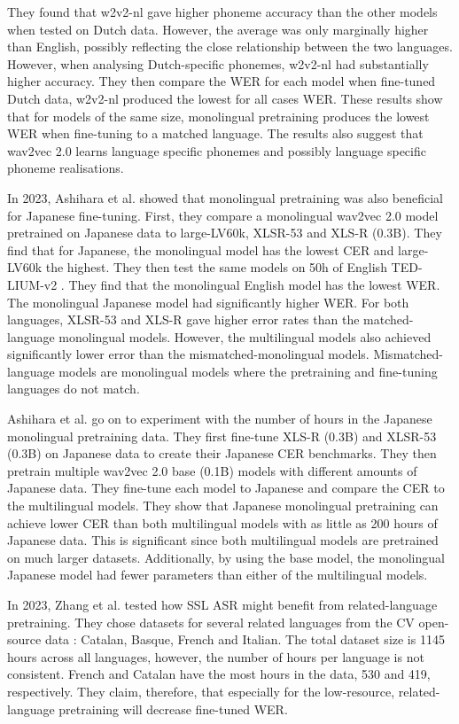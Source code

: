 They found that w2v2-nl gave higher phoneme accuracy than the other models when tested on Dutch data. However, the average was only marginally higher than English, possibly reflecting the close relationship between the two languages. However, when analysing Dutch-specific phonemes, w2v2-nl had substantially higher accuracy. They then compare the WER for each model when fine-tuned Dutch data, w2v2-nl produced the lowest for all cases WER. These results show that for models of the same size, monolingual pretraining produces the lowest WER when fine-tuning to a matched language. The results also suggest that wav2vec 2.0 learns language specific phonemes and possibly language specific phoneme realisations.

In 2023, Ashihara et al. \cite{ashihara2023exploration} showed that monolingual pretraining was also beneficial for Japanese fine-tuning. First, they compare a monolingual wav2vec 2.0 model pretrained on Japanese data to large-LV60k, XLSR-53 and XLS-R (0.3B). They find that for Japanese, the monolingual model has the lowest CER and large-LV60k the highest. They then test the same models on 50h of English TED-LIUM-v2 \cite{rousseau2014enhancing}. They find that the monolingual English model has the lowest WER. The monolingual Japanese model had significantly higher WER. For both languages, XLSR-53 and XLS-R gave higher error rates than the matched-language monolingual models. However, the multilingual models also achieved significantly lower error than the mismatched-monolingual models. Mismatched-language models are monolingual models where the pretraining and fine-tuning languages do not match.

Ashihara et al. \cite{ashihara2023exploration} go on to experiment with the number of hours in the Japanese monolingual pretraining data. They first fine-tune XLS-R (0.3B) and XLSR-53 (0.3B) on Japanese data to create their Japanese CER benchmarks. They then pretrain multiple wav2vec 2.0 base (0.1B) models with different amounts of Japanese data. They fine-tune each model to Japanese and compare the CER to the multilingual models. They show that Japanese monolingual pretraining can achieve lower CER than both multilingual models with as little as 200 hours of Japanese data. This is significant since both multilingual models are pretrained on much larger datasets. Additionally, by using the base model, the monolingual Japanese model had fewer parameters than either of the multilingual models.


In 2023, Zhang et al. \cite{zhang2023fast} tested how SSL ASR might benefit from related-language pretraining. They chose datasets for several related languages from the CV open-source data \cite{ardila-etal-2020-common}: Catalan, Basque, French and Italian. The total dataset size is 1145 hours across all languages, however, the number of hours per language is not consistent. French and Catalan have the most hours in the data, 530 and 419, respectively. They claim, therefore, that especially for the low-resource, related-language pretraining will decrease fine-tuned WER. \iffalse

